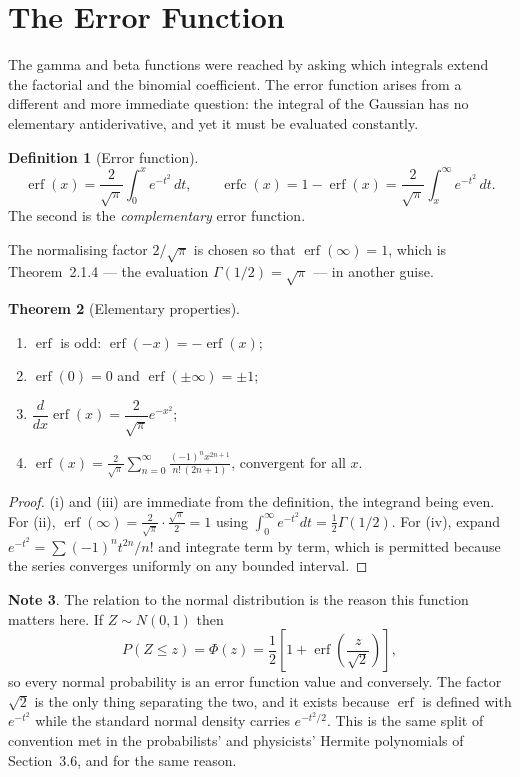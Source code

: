 \documentclass[12pt,a4paper]{report}
\theoremstyle{definition}
\newtheorem{thm}{Theorem}[section]
\newtheorem{defn}[thm]{Definition}
\newtheorem{note}[thm]{Note}
\theoremstyle{plain}
\begin{document}
\section{The Error Function}

The gamma and beta functions were reached by asking which integrals extend the
factorial and the binomial coefficient. The error function arises from a
different and more immediate question: the integral of the Gaussian has no
elementary antiderivative, and yet it must be evaluated constantly.

\begin{defn}[Error function]
$$\operatorname{erf}(x) = \frac{2}{\sqrt{\pi}}\int^{x}_{0}e^{-t^{2}}\,dt,
\qquad
\operatorname{erfc}(x) = 1-\operatorname{erf}(x)
= \frac{2}{\sqrt{\pi}}\int^{\infty}_{x}e^{-t^{2}}\,dt .$$
The second is the \emph{complementary} error function.
\end{defn}

The normalising factor $2/\sqrt{\pi}$ is chosen so that
$\operatorname{erf}(\infty)=1$, which is Theorem~2.1.4 --- the evaluation
$\Gamma(1/2)=\sqrt{\pi}$ --- in another guise.

\begin{thm}[Elementary properties]
\begin{enumerate}
\item[(i)] $\operatorname{erf}$ is odd: $\operatorname{erf}(-x) = -\operatorname{erf}(x)$;
\item[(ii)] $\operatorname{erf}(0)=0$ and $\operatorname{erf}(\pm\infty)=\pm1$;
\item[(iii)] $\dfrac{d}{dx}\operatorname{erf}(x) = \dfrac{2}{\sqrt{\pi}}e^{-x^{2}}$;
\item[(iv)] $\displaystyle\operatorname{erf}(x)
= \frac{2}{\sqrt{\pi}}\sum^{\infty}_{n=0}\frac{(-1)^{n}x^{2n+1}}{n!\,(2n+1)}$,
convergent for all $x$.
\end{enumerate}
\end{thm}

\begin{proof}
(i) and (iii) are immediate from the definition, the integrand being even.
For (ii), $\operatorname{erf}(\infty)=\frac{2}{\sqrt{\pi}}\cdot\frac{\sqrt{\pi}}{2}=1$
using $\int^{\infty}_{0}e^{-t^{2}}dt=\tfrac12\Gamma(1/2)$. For (iv), expand
$e^{-t^{2}}=\sum(-1)^{n}t^{2n}/n!$ and integrate term by term, which is
permitted because the series converges uniformly on any bounded interval.
\end{proof}

\begin{note}
The relation to the normal distribution is the reason this function matters
here. If $Z\sim N(0,1)$ then
$$P(Z\leq z) = \Phi(z)
= \frac{1}{2}\left[1+\operatorname{erf}\!\left(\frac{z}{\sqrt2}\right)\right],$$
so every normal probability is an error function value and conversely. The
factor $\sqrt2$ is the only thing separating the two, and it exists because
$\operatorname{erf}$ is defined with $e^{-t^{2}}$ while the standard normal
density carries $e^{-t^{2}/2}$. This is the same split of convention met in the
probabilists' and physicists' Hermite polynomials of Section~3.6, and for the
same reason.
\end{note}
\end{document}
